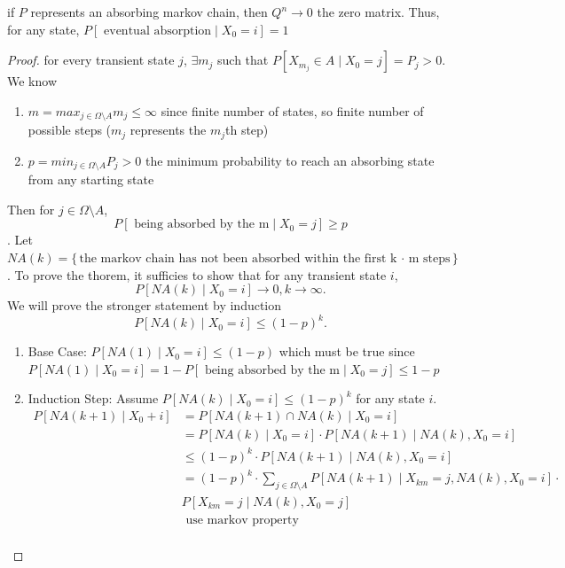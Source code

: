 \documentclass[a4paper]{article}
\begin{document}
\begin{theorem}
  if $P$ represents an absorbing markov chain, then  $Q^{n} \to 0$ the zero matrix. Thus, for any state,
  $P[\text{ eventual absorption} \mid X_0=i] = 1$

  \begin{proof}
    for every transient state $j$,  $\exists m_j$ such that $P[X_{m_j} \in A \mid  X_0 = j] = P_j > 0$. We know 
    \begin{enumerate}
      \item $m = max_{j \in \Omega \setminus A} m_j \leq \infty$ since finite number of states, so finite number of possible steps ($m_j$ represents the  $m_j$th step)
      \item $p = min_{j \in \Omega \setminus A} P_j > 0$ the minimum probability to reach an absorbing state from any starting state
    \end{enumerate}
    Then for $j \in \Omega \setminus A$, $$P[\text{ being absorbed by the m} \mid X_0 = j] \geq p$$. Let $NA(k) = \{\text{the markov chain has not been absorbed within the first k $\cdot$ m steps}\} $. To prove the thorem, it sufficies to show that for any transient state $i$,
     \[
       P[NA(k) \mid X_0 = i] \to 0, k \to \infty
    .\] 
    We will prove the stronger statement by induction
    \[
      P[NA(k) \mid  X_0 = i] \leq (1-p)^{k}
    .\] 
    \begin{enumerate}
      \item Base Case: $P[NA(1) \mid  X_0 = i] \leq (1-p)$ which must be true since $P[NA(1) \mid X_0 =i] = 1 - P[\text{ being absorbed by the m} \mid X_0 = j]  \leq 1 - p$
      \item Induction Step: Assume $P[NA(k) \mid  X_0 = i] \leq (1-p)^{k}$ for any state $i$. 
        \begin{align*}
          P[NA(k+1) \mid  X_0 + i] &= P[NA(k+1) \cap NA(k) \mid X_0 = i] \\
                                   &= P[NA(k) \mid X_0 = i] \cdot P[NA(k+1) \mid NA(k), X_0 =i] \\
                                   &\leq (1-p)^{k} \cdot P[NA(k+1) \mid  NA(k), X_0 = i]\\
                                   &=  (1-p)^{k} \cdot \sum_{j \in \Omega \setminus A} P[NA(k+1) \mid X_{km} = j, NA(k), X_0 = i] \cdot \\ 
                                   &P[X_{km} = j \mid NA(k), X_0=j] \\
                                   &\text{ use markov property}\\

\end{align*}
\end{enumerate}
\end{proof}
\end{theorem}
\end{document}
